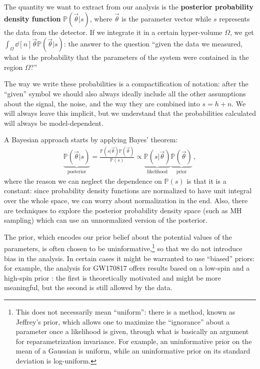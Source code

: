 \documentclass[main.tex]{subfiles}
\begin{document}
The quantity we want to extract from our analysis is the \textbf{posterior probability density function} \(\mathbb{P}(\vec{\theta} | s)\), where \(\vec{\theta}\) is the parameter vector while \(s\) represents the data from the detector. 
If we integrate it in a certain hyper-volume \(\Omega \), we get \(\int_{\Omega } \dd[n]{\vec{\theta}} \mathbb{P}(\vec{\theta} | s)\): the answer to the question ``given the data we measured, what is the probability that the parameters of the system were contained in the region \(\Omega \)?''

The way we write these probabilities is a compactification of notation: 
after the ``given'' symbol we should also always ideally include all the other assumptions about the signal, the noise, and the way they are combined into \(s = h + n\). We will always leave this implicit, but we understand that the probabilities calculated will always be model-dependent. 

A Bayesian approach starts by applying Bayes' theorem: 
%
\begin{align}
\underbrace{\mathbb{P}(\vec{\theta}| s )}_{\text{posterior}} = \frac{\mathbb{P}(s | \vec{\theta}) \mathbb{P}(\vec{\theta})}{\mathbb{P}(s)}
\propto \underbrace{\mathbb{P}(s | \vec{\theta})}_{\text{likelihood}} \underbrace{\mathbb{P}(\vec{\theta})}_{\text{prior}}
\,,
\end{align}
%
where the reason we can neglect the dependence on \(\mathbb{P}(s)\) is that it is a constant: since probability density functions are normalized to have unit integral over the whole space, we can worry about normalization in the end. 
Also, there are techniques to explore the posterior probability density space (such as \ac{MH} sampling) which can use an unnormalized version of the posterior.

The prior, which encodes our prior belief about the potential values of the parameters, is often chosen to be uninformative,\footnote{This does not necessarily mean ``uniform'': there is a method, known as Jeffrey's prior, which allows one to maximize the ``ignorance'' about a parameter once a likelihood is given, through what is basically an argument for reparametrization invariance. For example, an uninformative prior on the mean of a Gaussian is uniform, while an uninformative prior on its standard deviation is log-uniform.} so that we do not introduce bias in the analysis. 
In certain cases it might be warranted to use ``biased'' priors: for example, the analysis for GW170817 offers results based on a low-spin and a high-spin prior \cite{abbottGW170817ObservationGravitational2017}: the first is theoretically motivated and might be more meaningful, but the second is still allowed by the data. 
\end{document}

